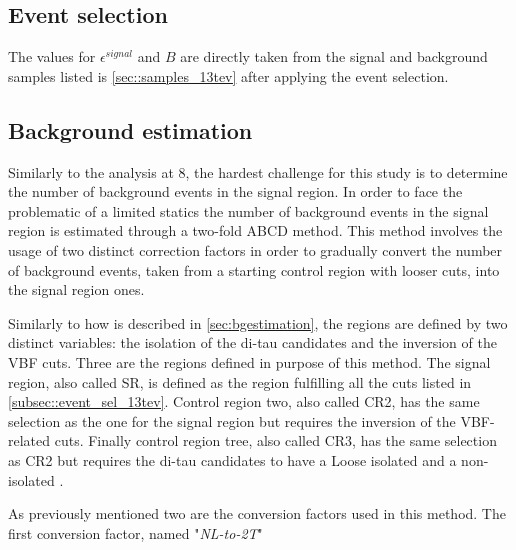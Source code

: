 \subsection{Event selection}
\label{subsec::event_sel_13tev}

The values for $\epsilon^{signal}$ and $B$ are directly taken from the signal and background samples listed is \autoref{sec::samples_13tev} after applying the event selection. 

\subsection{Background estimation}

Similarly to the analysis at 8\tev, the hardest challenge for this study is to determine the number of background events in the signal region. In order to face the problematic of a limited statics the number of background events in the signal region is estimated through a two-fold ABCD method. This method involves the usage of two distinct correction factors in order to gradually convert the number of background events, taken from a starting control region with looser cuts, into the signal region ones. 

Similarly to how is described in \autoref{sec:bgestimation}, the regions are defined by two distinct variables: the isolation of the di-tau candidates and the inversion of the VBF cuts. Three are the regions defined in purpose of this method. The signal region, also called SR, is defined as the region fulfilling all the cuts listed in \autoref{subsec::event_sel_13tev}. Control region two, also called CR2, has the same selection as the one for the signal region but requires the inversion of the VBF-related cuts. Finally control region tree, also called CR3, has the same selection as CR2 but requires the di-tau candidates to have a Loose isolated and a non-isolated \hadtau. 

As previously mentioned two are the conversion factors used in this method. The first conversion factor, named "\textit{NL-to-2T}"




